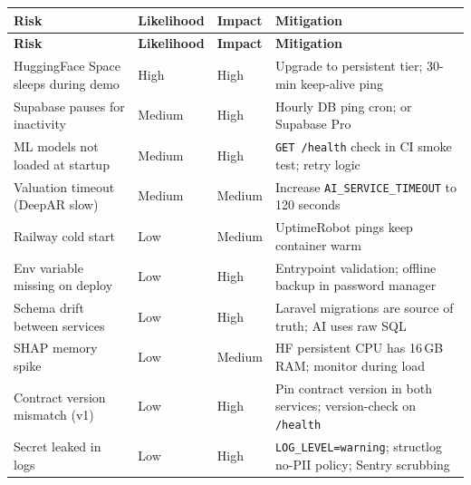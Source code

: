 \documentclass[12pt,a4paper]{report}
\begin{document}
\begin{longtable}{L{3.5cm} C{2cm} C{1.8cm} L{5cm}}
    \toprule
    \textbf{Risk} & \textbf{Likelihood} & \textbf{Impact} & \textbf{Mitigation} \\
    \midrule
    \endfirsthead
    \toprule
    \textbf{Risk} & \textbf{Likelihood} & \textbf{Impact} & \textbf{Mitigation} \\
    \midrule
    \endhead
    \bottomrule
    \endlastfoot

    HuggingFace Space sleeps during demo &
    \textcolor{dangerred}{High} &
    \textcolor{dangerred}{High} &
    Upgrade to persistent tier; 30-min keep-alive ping \\[6pt]

    Supabase pauses for inactivity &
    \textcolor{warningorange}{Medium} &
    \textcolor{dangerred}{High} &
    Hourly DB ping cron; or Supabase Pro \\[6pt]

    ML models not loaded at startup &
    \textcolor{warningorange}{Medium} &
    \textcolor{dangerred}{High} &
    \texttt{GET /health} check in CI smoke test; retry logic \\[6pt]

    Valuation timeout (DeepAR slow) &
    \textcolor{warningorange}{Medium} &
    \textcolor{warningorange}{Medium} &
    Increase \texttt{AI\_SERVICE\_TIMEOUT} to 120 seconds \\[6pt]

    Railway cold start &
    \textcolor{successgreen}{Low} &
    \textcolor{warningorange}{Medium} &
    UptimeRobot pings keep container warm \\[6pt]

    Env variable missing on deploy &
    \textcolor{successgreen}{Low} &
    \textcolor{dangerred}{High} &
    Entrypoint validation; offline backup in password manager \\[6pt]

    Schema drift between services &
    \textcolor{successgreen}{Low} &
    \textcolor{dangerred}{High} &
    Laravel migrations are source of truth; AI uses raw SQL \\[6pt]

    SHAP memory spike &
    \textcolor{successgreen}{Low} &
    \textcolor{warningorange}{Medium} &
    HF persistent CPU has 16\,GB RAM; monitor during load \\[6pt]

    Contract version mismatch (v1) &
    \textcolor{successgreen}{Low} &
    \textcolor{dangerred}{High} &
    Pin contract version in both services; version-check on \texttt{/health} \\[6pt]

    Secret leaked in logs &
    \textcolor{successgreen}{Low} &
    \textcolor{dangerred}{High} &
    \texttt{LOG\_LEVEL=warning}; structlog no-PII policy; Sentry scrubbing \\

\end{longtable}
\end{document}
